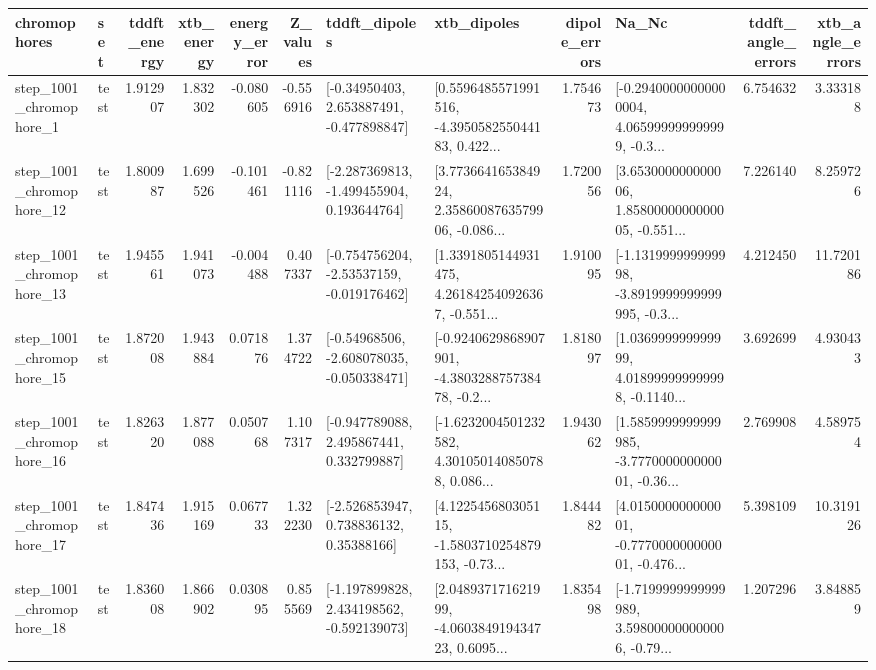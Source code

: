 \begin{tabular}{llrrrrllrlrr}
\toprule
             chromophores &       set &  tddft\_energy &  xtb\_energy &  energy\_error &  Z\_values &                               tddft\_dipoles &                                        xtb\_dipoles &  dipole\_errors &                                              Na\_Nc &  tddft\_angle\_errors &  xtb\_angle\_errors \\
\midrule
  step\_1001\_chromophore\_1 &      test &      1.912907 &    1.832302 &     -0.080605 & -0.556916 &    [-0.34950403, 2.653887491, -0.477898847] &  [0.5596485571991516, -4.395058255044183, 0.422... &       1.754673 &  [-0.29400000000000004, 4.065999999999999, -0.3... &            6.754632 &          3.333188 \\
 step\_1001\_chromophore\_12 &      test &      1.800987 &    1.699526 &     -0.101461 & -0.821116 &   [-2.287369813, -1.499455904, 0.193644764] &  [3.773664165384924, 2.3586008763579906, -0.086... &       1.720056 &  [3.653000000000006, 1.8580000000000005, -0.551... &            7.226140 &          8.259726 \\
 step\_1001\_chromophore\_13 &      test &      1.945561 &    1.941073 &     -0.004488 &  0.407337 &   [-0.754756204, -2.53537159, -0.019176462] &  [1.3391805144931475, 4.261842540926367, -0.551... &       1.910095 &  [-1.131999999999998, -3.8919999999999995, -0.3... &            4.212450 &         11.720186 \\
 step\_1001\_chromophore\_15 &      test &      1.872008 &    1.943884 &      0.071876 &  1.374722 &   [-0.54968506, -2.608078035, -0.050338471] &  [-0.9240629868907901, -4.380328875738478, -0.2... &       1.818097 &  [1.036999999999999, 4.018999999999998, -0.1140... &            3.692699 &          4.930433 \\
 step\_1001\_chromophore\_16 &      test &      1.826320 &    1.877088 &      0.050768 &  1.107317 &    [-0.947789088, 2.495867441, 0.332799887] &  [-1.6232004501232582, 4.301050140850788, 0.086... &       1.943062 &  [1.5859999999999985, -3.777000000000001, -0.36... &            2.769908 &          4.589754 \\
 step\_1001\_chromophore\_17 &      test &      1.847436 &    1.915169 &      0.067733 &  1.322230 &     [-2.526853947, 0.738836132, 0.35388166] &  [4.122545680305115, -1.5803710254879153, -0.73... &       1.844482 &  [4.015000000000001, -0.777000000000001, -0.476... &            5.398109 &         10.319126 \\
 step\_1001\_chromophore\_18 &      test &      1.836008 &    1.866902 &      0.030895 &  0.855569 &   [-1.197899828, 2.434198562, -0.592139073] &  [2.048937171621999, -4.060384919434723, 0.6095... &       1.835498 &  [-1.7199999999999989, 3.598000000000006, -0.79... &            1.207296 &          3.848859 \\

\end{tabular}
